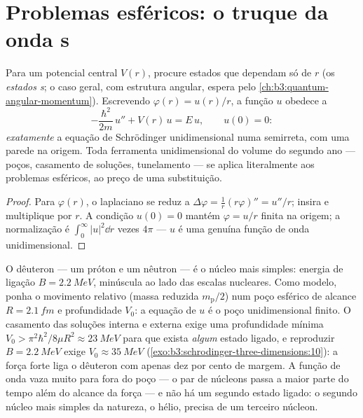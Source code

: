 \section{Problemas esféricos: o truque da onda s}

\begin{proposition}\label{prop:b3:schrodinger-three-dimensions:swave}
Para um potencial central $V(r)$, procure estados que dependam só de
$r$ (os \emph{estados s}; o caso geral, com estrutura angular, espera
pelo \cref{ch:b3:quantum-angular-momentum}). Escrevendo
$\varphi(r) = u(r)/r$, a função $u$ obedece a
\[
-\frac{\hbar^2}{2m}\,u'' + V(r)\,u = E\,u ,
\qquad u(0) = 0 :
\]
\emph{exatamente} a equação de Schrödinger unidimensional numa
semirreta, com uma parede na origem. Toda ferramenta unidimensional do
volume do segundo ano --- poços, casamento de soluções, tunelamento ---
se aplica literalmente aos problemas esféricos, ao preço de uma
substituição.
\end{proposition}

\begin{proof}
Para $\varphi(r)$, o laplaciano se reduz a $\Delta\varphi =
\tfrac1r(r\varphi)'' = u''/r$; insira e multiplique por $r$. A
condição $u(0) = 0$ mantém $\varphi = u/r$ finita na origem; a
normalização é $\int_0^\infty|u|^2\dd r$ vezes $4\pi$ --- $u$ é uma
genuína função de onda unidimensional.
\end{proof}

\begin{example}\label{ex:b3:schrodinger-three-dimensions:deuteron}
O dêuteron --- um próton e um nêutron --- é o núcleo mais simples:
energia de ligação $B = \qty{2.2}{MeV}$, minúscula ao lado das escalas
nucleares. Como modelo, ponha o movimento relativo (massa reduzida
$m_{\text{p}}/2$) num poço esférico de alcance $R = \qty{2.1}{fm}$ e
profundidade $V_0$: a equação de $u$ é o poço unidimensional finito. O
casamento das soluções interna e externa exige uma profundidade mínima
$V_0 > \pi^2\hbar^2/8\mu R^2
\approx \qty{23}{MeV}$ para que exista \emph{algum} estado ligado, e
reproduzir $B = \qty{2.2}{MeV}$ exige $V_0 \approx \qty{35}{MeV}$
(\cref{exo:b3:schrodinger-three-dimensions:10}): a força forte liga o
dêuteron com apenas dez por cento de margem. A função de onda vaza
muito para fora do poço --- o par de núcleons passa a maior parte do
tempo além do alcance da força --- e não há um segundo estado ligado: o
segundo núcleo mais simples da natureza, o hélio, precisa de um
terceiro núcleon.
\end{example}

